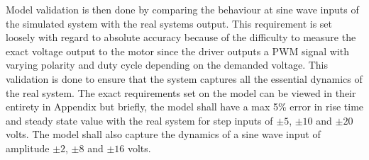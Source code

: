 Model validation is then done by comparing the behaviour at sine wave inputs of
the simulated system with the real systems output.  This requirement is set
loosely with regard to absolute accuracy because of the difficulty to measure
the exact voltage output to the motor since the driver outputs a PWM signal with
varying polarity and duty cycle depending on the demanded voltage. This
validation is done to ensure that the system captures all the essential dynamics
of the real system. The exact requirements set on the model can be viewed in
their entirety in Appendix %
but briefly, the model shall have a  max 5\% error in rise time and steady state
value with the real system for step inputs of $\pm5$, $\pm10$ and $\pm20$ volts.
The model shall also capture the dynamics of a sine wave input of amplitude
$\pm2$, $\pm8$ and $\pm16$ volts.

